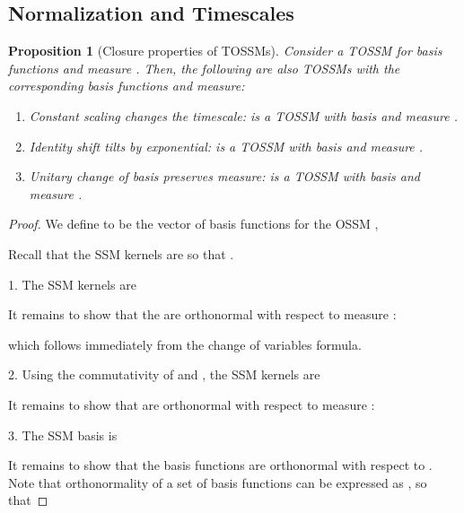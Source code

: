 \documentclass{article}
\newtheorem{proposition}[theorem]{Proposition}
\begin{document}
 
\subsection{Normalization and Timescales}
\label{sec:proofs:timescale}



\begin{proposition}[Closure properties of TOSSMs]\label{prop:closure}
  Consider a TOSSM  for basis functions  and measure .
  Then, the following are also TOSSMs with the corresponding basis functions and measure:
  \begin{enumerate}
      \item Constant scaling changes the timescale:
       is a TOSSM with basis  and measure .
      \item Identity shift tilts by exponential:
       is a TOSSM with basis  and measure .
      \item Unitary change of basis preserves measure:
         is a TOSSM with basis  and measure .
  \end{enumerate}
\end{proposition}
\begin{proof}

We define  to be the vector of basis functions for the OSSM ,

Recall that the SSM kernels are  so that .

1. The SSM kernels are


It remains to show that the  are orthonormal with respect to measure :

which follows immediately from the change of variables formula.



2. Using the commutativity of  and , the SSM kernels are


It remains to show that  are orthonormal with respect to measure :


3. The SSM basis is


It remains to show that the basis functions  are orthonormal with respect to .
Note that orthonormality of a set of basis functions can be expressed as ,
so that



\end{proof}
  
\end{document}
